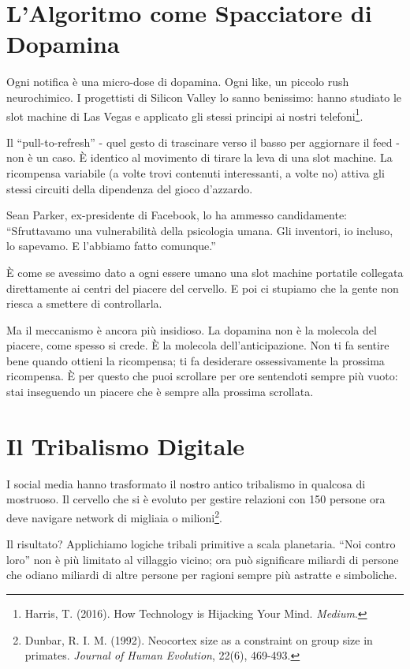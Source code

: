 \section{L'Algoritmo come Spacciatore di Dopamina}

Ogni notifica è una micro-dose di dopamina. Ogni like, un piccolo rush neurochimico. I progettisti di Silicon Valley lo sanno benissimo: hanno studiato le slot machine di Las Vegas e applicato gli stessi principi ai nostri telefoni\footnote{Harris, T. (2016). How Technology is Hijacking Your Mind. \textit{Medium}.}.

Il ``pull-to-refresh'' - quel gesto di trascinare verso il basso per aggiornare il feed - non è un caso. È identico al movimento di tirare la leva di una slot machine. La ricompensa variabile (a volte trovi contenuti interessanti, a volte no) attiva gli stessi circuiti della dipendenza del gioco d'azzardo.

Sean Parker, ex-presidente di Facebook, lo ha ammesso candidamente: ``Sfruttavamo una vulnerabilità della psicologia umana. Gli inventori, io incluso, lo sapevamo. E l'abbiamo fatto comunque.''

È come se avessimo dato a ogni essere umano una slot machine portatile collegata direttamente ai centri del piacere del cervello. E poi ci stupiamo che la gente non riesca a smettere di controllarla.

Ma il meccanismo è ancora più insidioso. La dopamina non è la molecola del piacere, come spesso si crede. È la molecola dell'anticipazione. Non ti fa sentire bene quando ottieni la ricompensa; ti fa desiderare ossessivamente la prossima ricompensa. È per questo che puoi scrollare per ore sentendoti sempre più vuoto: stai inseguendo un piacere che è sempre alla prossima scrollata.

\section{Il Tribalismo Digitale}

I social media hanno trasformato il nostro antico tribalismo in qualcosa di mostruoso. Il cervello che si è evoluto per gestire relazioni con 150 persone ora deve navigare network di migliaia o milioni\footnote{Dunbar, R. I. M. (1992). Neocortex size as a constraint on group size in primates. \textit{Journal of Human Evolution}, 22(6), 469-493.}.

Il risultato? Applichiamo logiche tribali primitive a scala planetaria. ``Noi contro loro'' non è più limitato al villaggio vicino; ora può significare miliardi di persone che odiano miliardi di altre persone per ragioni sempre più astratte e simboliche.


